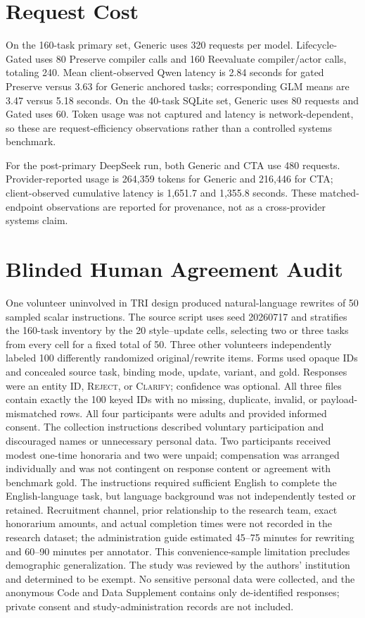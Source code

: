 \documentclass[10pt]{article}
\begin{document}
\section{Request Cost}
On the 160-task primary set, Generic uses 320 requests per model. Lifecycle-Gated uses 80
Preserve compiler calls and 160 Reevaluate compiler/actor calls, totaling 240. Mean
client-observed Qwen latency is 2.84 seconds for gated Preserve versus 3.63 for Generic
anchored tasks; corresponding GLM means are 3.47 versus 5.18 seconds. On the 40-task SQLite
set, Generic uses 80 requests and Gated uses 60. Token usage was not captured and latency is
network-dependent, so these are request-efficiency observations rather than a controlled
systems benchmark.

For the post-primary DeepSeek \NewSchemaReplication{} run, both Generic and CTA use 480 requests. Provider-reported
usage is 264,359 tokens for Generic and 216,446 for CTA; client-observed cumulative latency is
1,651.7 and 1,355.8 seconds. These matched-endpoint observations are reported for provenance,
not as a cross-provider systems claim.

\section{Blinded Human Agreement Audit}
One volunteer uninvolved in TRI design produced natural-language rewrites of 50 sampled scalar
instructions.
The source script uses seed 20260717 and stratifies the 160-task inventory by the 20
style--update cells, selecting two or three tasks from every cell for a fixed total of 50.
Three other volunteers independently labeled 100 differently randomized original/rewrite
items. Forms used opaque IDs and concealed source task, binding mode, update, variant, and
gold. Responses were an entity ID, \textsc{Reject}, or \textsc{Clarify}; confidence was
optional. All three files contain exactly the 100 keyed IDs with no missing, duplicate,
invalid, or payload-mismatched rows.
All four participants were adults and provided informed consent. The collection instructions
described voluntary participation and discouraged names or unnecessary personal data. Two
participants received modest one-time honoraria and two were unpaid; compensation was arranged
individually and was not contingent on response content or agreement with benchmark gold.
The instructions required sufficient English to complete the English-language task, but language
background was not independently tested or retained. Recruitment channel, prior relationship to
the research team, exact honorarium amounts, and actual completion times were not recorded in the
research dataset; the administration guide estimated 45--75 minutes for rewriting and 60--90
minutes per annotator. This convenience-sample limitation precludes demographic generalization.
The study was reviewed by the authors' institution and determined to be exempt. No sensitive
personal data were collected, and the anonymous Code and Data Supplement contains only de-identified
responses; private consent and study-administration records are not included.
\end{document}

